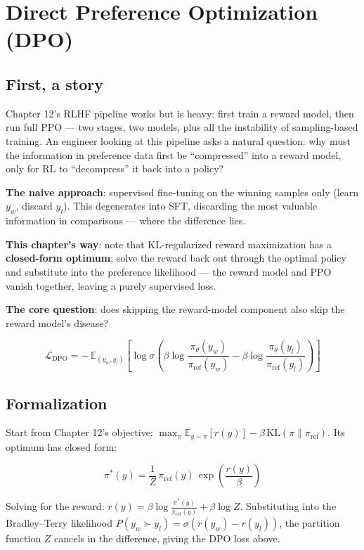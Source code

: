 \documentclass{article}
\begin{document}
\section*{Direct Preference Optimization (DPO)}

\subsection*{First, a story}

Chapter 12's RLHF pipeline works but is heavy: first train a reward model, then run full PPO --- two stages, two models, plus all the instability of sampling-based training. An engineer looking at this pipeline asks a natural question: why must the information in preference data first be ``compressed'' into a reward model, only for RL to ``decompress'' it back into a policy?

\textbf{The naive approach}: supervised fine-tuning on the winning samples only (learn $y_w$, discard $y_l$). This degenerates into SFT, discarding the most valuable information in comparisons --- where the difference lies.

\textbf{This chapter's way}: note that KL-regularized reward maximization has a \textbf{closed-form optimum}; solve the reward back out through the optimal policy and substitute into the preference likelihood --- the reward model and PPO vanish together, leaving a purely supervised loss.

\textbf{The core question}: does skipping the reward-model component also skip the reward model's disease?

\[
\boxed{\mathcal{L}_{\mathrm{DPO}} = -\,\mathbb{E}_{(y_w, y_l)}\left[\log \sigma\!\left(\beta\log\frac{\pi_{\theta}(y_w)}{\pi_{\mathrm{ref}}(y_w)} - \beta\log\frac{\pi_{\theta}(y_l)}{\pi_{\mathrm{ref}}(y_l)}\right)\right]}
\]

\subsection*{Formalization}

Start from Chapter 12's objective: $\max_{\pi} \mathbb{E}_{y\sim\pi}[r(y)] - \beta\,\mathrm{KL}(\pi \| \pi_{\mathrm{ref}})$. Its optimum has closed form:

\[
\boxed{\pi^{*}(y) = \frac{1}{Z}\,\pi_{\mathrm{ref}}(y)\,\exp\!\left(\frac{r(y)}{\beta}\right)}
\]

Solving for the reward: $r(y) = \beta\log\frac{\pi^{*}(y)}{\pi_{\mathrm{ref}}(y)} + \beta\log Z$. Substituting into the Bradley--Terry likelihood $P(y_w \succ y_l)=\sigma(r(y_w)-r(y_l))$, the partition function $Z$ cancels in the difference, giving the DPO loss above.
\end{document}
